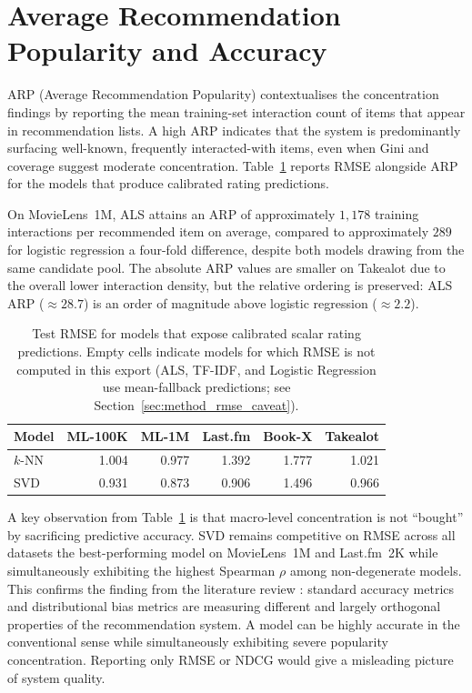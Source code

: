 \documentclass[11pt,a4paper]{report}
\begin{document}
\section{Average Recommendation Popularity and Accuracy}
\label{sec:expa_arp}

ARP (Average Recommendation Popularity) contextualises the concentration findings by reporting the mean training-set interaction count of items that appear in recommendation lists. A high ARP indicates that the system is predominantly surfacing well-known, frequently interacted-with items, even when Gini and coverage suggest moderate concentration. Table~\ref{tab:macro-rmse} reports RMSE alongside ARP for the models that produce calibrated rating predictions.

On MovieLens~1M, ALS attains an ARP of approximately $1{,}178$ training interactions per recommended item on average, compared to approximately $289$ for logistic regression a four-fold difference, despite both models drawing from the same candidate pool. The absolute ARP values are smaller on Takealot due to the overall lower interaction density, but the relative ordering is preserved: ALS ARP ($\approx 28.7$) is an order of magnitude above logistic regression ($\approx 2.2$).

\begin{table}[htbp]
  \centering
  \caption{Test RMSE for models that expose calibrated scalar rating predictions. Empty cells indicate models for which RMSE is not computed in this export (ALS, TF-IDF, and Logistic Regression use mean-fallback predictions; see Section~\ref{sec:method_rmse_caveat}).}
  \label{tab:macro-rmse}
  \begin{tabular}{@{}l rrrrr@{}}
    \toprule
    \textbf{Model} & \textbf{ML-100K} & \textbf{ML-1M} & \textbf{Last.fm} & \textbf{Book-X} & \textbf{Takealot} \\
    \midrule
    $k$-NN & 1.004 & 0.977 & 1.392 & 1.777 & 1.021 \\
    SVD    & 0.931 & 0.873 & 0.906 & 1.496 & 0.966 \\
    \bottomrule
  \end{tabular}
\end{table}

A key observation from Table~\ref{tab:macro-rmse} is that macro-level concentration is not ``bought'' by sacrificing predictive accuracy. SVD remains competitive on RMSE across all datasets the best-performing model on MovieLens~1M and Last.fm~2K while simultaneously exhibiting the highest Spearman $\rho$ among non-degenerate models. This confirms the finding from the literature review \citep{steck2011itempopularity}: standard accuracy metrics and distributional bias metrics are measuring different and largely orthogonal properties of the recommendation system. A model can be highly accurate in the conventional sense while simultaneously exhibiting severe popularity concentration. Reporting only RMSE or NDCG would give a misleading picture of system quality.
\end{document}
